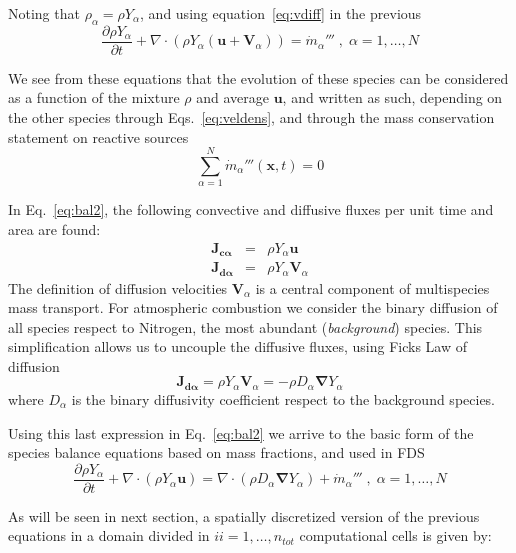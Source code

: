 Noting that $ \rho_\alpha = \rho Y_\alpha$, and using equation~\eqref{eq:vdiff} in the previous
%
\begin{equation}
   \frac{\partial \rho Y_\alpha}{ \partial t} + \nabla \cdot \left( \rho Y_\alpha  (\mathbf{u}+\mathbf{V}_\alpha) \right) = \dot{m}_\alpha''' \; , \; \alpha=1,\dots,N \label{eq:bal2}
\end{equation}
%

We see from these equations that the evolution of these species can be considered as a function of the mixture $\rho$ and average $\mathbf{u}$, and written as such, depending on the other species through Eqs.~\eqref{eq:veldens}, and through the mass conservation statement on reactive sources
%
\begin{equation}
  \sum\limits_{\alpha=1}^{N} \dot{m}_\alpha'''(\mathbf{x},t) = 0
\end{equation}
%

In Eq.~\eqref{eq:bal2}, the following convective and diffusive fluxes per unit time and area are found:
%
\begin{eqnarray}
  \mathbf{J_{c \alpha}} &=& \rho Y_\alpha  \mathbf{u} \label{eq:jc} \\
  \mathbf{J_{d \alpha}} &=& \rho Y_\alpha  \mathbf{V}_\alpha \label{eq:jd}
\end{eqnarray}
%
The definition of diffusion velocities $\mathbf{V}_\alpha$ is a central component of multispecies mass transport. For atmospheric combustion we consider the binary diffusion of all species respect to Nitrogen, the most abundant (\textit{background}) species. This simplification allows us to uncouple the diffusive fluxes, using Ficks Law of diffusion
%
\begin{equation}
   \mathbf{J_{d \alpha}} = \rho Y_\alpha  \mathbf{V}_\alpha = - \rho D_\alpha \boldsymbol{\nabla} Y_\alpha
\end{equation}
%
where $D_\alpha$ is the binary diffusivity coefficient respect to the background species.

Using this last expression in Eq.~\eqref{eq:bal2} we arrive to the basic form of the species balance equations based on mass fractions, and used in FDS
%
\begin{equation}
   \frac{\partial \rho Y_\alpha}{ \partial t} + \nabla \cdot ( \rho Y_\alpha  \mathbf{u} ) = \nabla \cdot ( \rho D_\alpha \boldsymbol{\nabla} Y_\alpha ) + \dot{m}_\alpha''' \; , \; \alpha=1,\dots,N \label{eq:bal3}
\end{equation}
%

As will be seen in next section, a spatially discretized version of the previous equations in a domain divided in $ii=1,\ldots,n_{tot}$ computational cells is given by:

